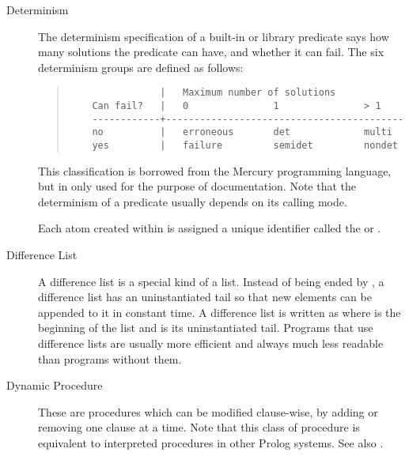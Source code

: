 \begin{description}
\item[Determinism]
The determinism specification of a built-in or library predicate says
how many solutions the predicate can have, and whether it can fail.
The six determinism groups are defined as follows:
\begin{quote}
\begin{verbatim}
                |   Maximum number of solutions
    Can fail?   |   0               1               > 1
    ------------+------------------------------------------
    no          |   erroneous       det             multi
    yes         |   failure         semidet         nondet
\end{verbatim}
\end{quote}
This classification is borrowed from the Mercury programming language,
but in {\eclipse} only used for the purpose of documentation.
Note that the determinism of a predicate usually depends on its calling mode.

\item[]
Each atom created within {\eclipse} is assigned a unique
identifier called the  or .

\item[Difference List]
A difference list is a special kind of a list.
Instead of being ended by , a difference list
has an uninstantiated tail so that new elements
can be appended to it in constant time.
A difference list is written as 
where  is the beginning of the list and 
is its uninstantiated tail.
Programs that use difference lists are usually more efficient
and always much less readable than programs without them.

\item[Dynamic Procedure]
These are procedures which can be modified clause-wise, by adding or removing
one clause at a time. Note that this class of procedure is equivalent to
interpreted procedures in other Prolog systems. See also .



\end{description}
